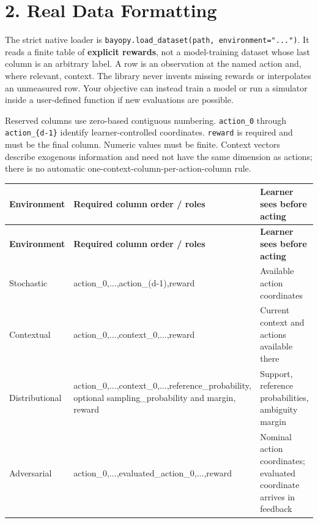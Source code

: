 \documentclass[10pt,a4paper]{article}
\begin{document}
\clearpage
{}
\section*{2. Real Data Formatting}

The strict native loader is \texttt{bayopy.\allowbreak{}load\_\allowbreak{}dataset(path,\allowbreak{} environment=\allowbreak{}".\allowbreak{}.\allowbreak{}.\allowbreak{}")}. It reads a finite table of \textbf{explicit rewards},\allowbreak{} not a model-training dataset whose last column is an arbitrary label. A row is an observation at the named action and,\allowbreak{} where relevant,\allowbreak{} context. The library never invents missing rewards or interpolates an unmeasured row. Your objective can instead train a model or run a simulator inside a user-defined function if new evaluations are possible.


Reserved columns use zero-based contiguous numbering. \texttt{action\_\allowbreak{}0} through \texttt{action\_\allowbreak{}\{d-1\}} identify learner-controlled coordinates. \texttt{reward} is required and must be the final column. Numeric values must be finite. Context vectors describe exogenous information and need not have the same dimension as actions; there is no automatic one-context-column-per-action-column rule.


{\small
\begin{longtable}{@{}>{\raggedright\arraybackslash}p{0.1800\dimexpr\linewidth-4\tabcolsep\relax}>{\raggedright\arraybackslash}p{0.3500\dimexpr\linewidth-4\tabcolsep\relax}>{\raggedright\arraybackslash}p{0.4700\dimexpr\linewidth-4\tabcolsep\relax}@{}}
\toprule
\textbf{Environment} & \textbf{Required column order / roles} & \textbf{Learner sees before acting} \\
\midrule\endfirsthead
\toprule
\textbf{Environment} & \textbf{Required column order / roles} & \textbf{Learner sees before acting} \\
\midrule\endhead
Stochastic & action\_\allowbreak{}0,\allowbreak{}...,\allowbreak{}action\_\allowbreak{}(d-1),\allowbreak{}reward & Available action coordinates \\
Contextual & action\_\allowbreak{}0,\allowbreak{}...,\allowbreak{}context\_\allowbreak{}0,\allowbreak{}...,\allowbreak{}reward & Current context and actions available there \\
Distributional & action\_\allowbreak{}0,\allowbreak{}...,\allowbreak{}context\_\allowbreak{}0,\allowbreak{}...,\allowbreak{}reference\_\allowbreak{}probability,\allowbreak{} optional sampling\_\allowbreak{}probability and margin,\allowbreak{} reward & Support,\allowbreak{} reference probabilities,\allowbreak{} ambiguity margin \\
Adversarial & action\_\allowbreak{}0,\allowbreak{}...,\allowbreak{}evaluated\_\allowbreak{}action\_\allowbreak{}0,\allowbreak{}...,\allowbreak{}reward & Nominal action coordinates; evaluated coordinate arrives in feedback \\
\bottomrule
\end{longtable}
}
\end{document}
